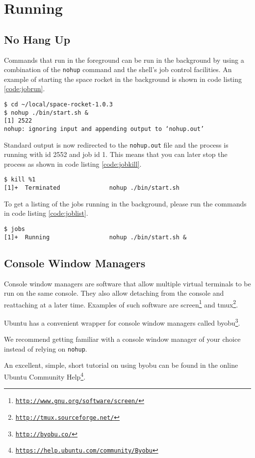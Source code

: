 \section{Running}
\label{sec:running}

\subsection{No Hang Up}

Commands that run in the foreground can be run in the background by
using a combination of the \texttt{nohup} command and the shell's job
control facilities. An example of starting the space rocket in the
background is shown in code listing \ref{code:jobrun}.

\begin{lstlisting}[label=code:jobrun,caption=Starting the space rocket in the background]
$ cd ~/local/space-rocket-1.0.3
$ nohup ./bin/start.sh &
[1] 2522
nohup: ignoring input and appending output to ‘nohup.out’
\end{lstlisting}

Standard output is now redirected to the \texttt{nohup.out} file and the
process is running with id 2552 and job id 1. This means that you can
later stop the process as shown in code listing \ref{code:jobkill}.

\begin{lstlisting}[label=code:jobkill,caption=Stopping the space rocket]
$ kill %1
[1]+  Terminated              nohup ./bin/start.sh
\end{lstlisting}

To get a listing of the jobs running in the background, please run the
commands in code listing \ref{code:joblist}.

\begin{lstlisting}[label=code:joblist,caption=Listing the jobs running in the background]
$ jobs
[1]+  Running                 nohup ./bin/start.sh &
\end{lstlisting}

\subsection{Console Window Managers}

Console window managers are software that allow multiple virtual
terminals to be run on the same console. They also allow detaching from
the console and reattaching at a later time. Examples of such software
are
screen\footnote{\href{http://www.gnu.org/software/screen/}{\texttt{http://www.gnu.org/software/screen/}}}
and
tmux\footnote{\href{http://tmux.sourceforge.net/}{\texttt{http://tmux.sourceforge.net/}}}.

Ubuntu has a convenient wrapper for console window managers called
byobu\footnote{\href{http://byobu.co/}{\texttt{http://byobu.co/}}}.

We recommend getting familiar with a console window manager of your
choice instead of relying on \texttt{nohup}.

An excellent, simple, short tutorial on using byobu can be found in the
online Ubuntu Community
Help\footnote{\href{https://help.ubuntu.com/community/Byobu}{\texttt{https://help.ubuntu.com/community/Byobu}}}.
